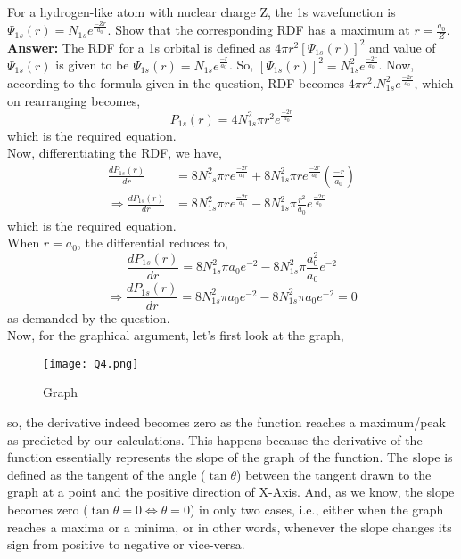 \documentclass[11pt]{article}
\begin{document}
For a hydrogen-like atom with nuclear charge Z, the 1s wavefunction is $\Psi_{1s}(r)=N_{1s}e^{\frac{-Zr}{a_{0}}}$. Show that the corresponding RDF has a maximum at $r = \frac{a_{0}}{Z}$.\\[16pt]

\textbf{Answer: }The RDF for a 1s orbital is defined as $4\pi r^{2}[\Psi_{1s}(r)]^{2}$ and value of $\Psi_{1s}(r)$ is given to be $\Psi_{1s}(r)=N_{1s}e^{\frac{-r}{a_{0}}}$. So, $[\Psi_{1s}(r)]^{2}=N_{1s}^{2}e^{\frac{-2r}{a_{0}}}$. Now, according to the formula given in the question, RDF becomes $4\pi r^{2} . N_{1s}^{2}e^{\frac{-2r}{a_{0}}}$, which on rearranging becomes, $$P_{1s}(r)=4N_{1s}^{2}\pi r^{2} e^{\frac{-2r}{a_{0}}}$$ which is the required equation.\\

Now, differentiating the RDF, we have,
\begin{align}
	\frac{dP_{1s}(r)}{dr}&=8N_{1s}^{2}\pi re^{\frac{-2r}{a_{0}}} + 8N_{1s}^{2}\pi re^{\frac{-2r}{a_{0}}}\left(\frac{-r}{a_{0}}\right)\\
	\Rightarrow\frac{dP_{1s}(r)}{dr}&=8N_{1s}^{2}\pi r e^{\frac{-2r}{a_{0}}}-8N_{1s}^{2}\pi \frac{r^{2}}{a_{0}} e^{\frac{-2r}{a_{0}}}
\end{align}
which is the required equation.\\

When $r=a_{0}$, the differential reduces to,
$$\frac{dP_{1s}(r)}{dr}=8N_{1s}^{2}\pi a_{0} e^{-2}-8N_{1s}^{2}\pi \frac{a_{0}^{2}}{a_{0}} e^{-2}$$
$$\Rightarrow\frac{dP_{1s}(r)}{dr}=8N_{1s}^{2}\pi a_{0} e^{-2}-8N_{1s}^{2}\pi a_{0} e^{-2}=0$$
as demanded by the question.\\

Now, for the graphical argument, let's first look at the graph,\\

	\begin{figure}[H]
	\centering
	\texttt{[image: Q4.png]}
	\caption{Graph}
	\label{figure:graph}
\end{figure}

so, the derivative indeed becomes zero as the function reaches a maximum/peak as predicted by our calculations. This happens because the derivative of the function essentially represents the slope of the graph of the function. The slope is defined as the tangent of the angle ($\tan\theta$) between the tangent drawn to the graph at a point and the positive direction of X-Axis. And, as we know, the slope becomes zero ($\tan\theta=0 \Leftrightarrow \theta=0$) in only two cases, i.e., either when the graph reaches a maxima or a minima, or in other words, whenever the slope changes its sign from positive to negative or vice-versa.\\
\end{document}
